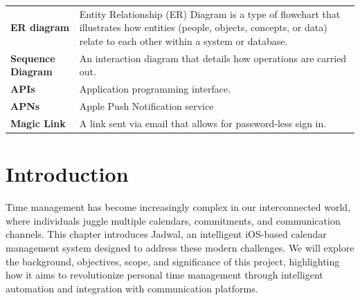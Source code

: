\documentclass[12pt,a4paper,twoside]{report}
\begin{document}
\begin{singlespace}
\begin{center}
\begin{longtable}{p{}p{}}
            \textbf{ER diagram}       & Entity Relationship (ER) Diagram is a type of flowchart that illustrates how entities (people, objects, concepts, or data) relate to each other within a system or database. \\[1ex]

            \textbf{Sequence Diagram} & An interaction diagram that details how operations are carried out.                                                                                                          \\[1ex]

            \textbf{APIs}             & Application programming interface.                                                                                                                                           \\[1ex]

            \textbf{APNs}             & Apple Push Notification service                                                                                                                                              \\

            \textbf{Magic Link}       & A link sent via email that allows for password-less sign in.                                                                                                                 \\

            \bottomrule
        \end{longtable}
    \end{center}

\end{singlespace}


\chapter{Introduction}

Time management has become increasingly complex in our interconnected world, where individuals juggle multiple calendars, commitments, and communication channels. This chapter introduces Jadwal, an intelligent iOS-based calendar management system designed to address these modern challenges. We will explore the background, objectives, scope, and significance of this project, highlighting how it aims to revolutionize personal time management through intelligent automation and integration with communication platforms.
\end{document}
